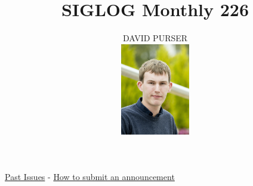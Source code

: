 \documentclass[prodmode,acmtecs]{acmsmall} %
\newcounter{colstart}
\begin{document}
\setcounter{colstart}{\thepage}

\title{\huge\sc SIGLOG Monthly 226}
\author{DAVID PURSER
\vspace*{-2.6cm}\begin{flushright}\includegraphics[width=30mm]{dp}\end{flushright}
}

\maketitlee

\href{https://lics.siglog.org/newsletters/}{Past Issues}
 - 
\href{https://lics.siglog.org/newsletters/inst.html}{How to submit an announcement}
\end{document}
